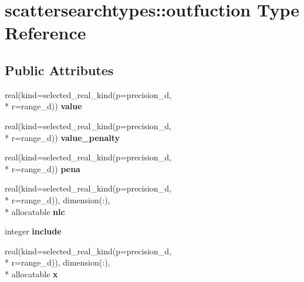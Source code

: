 \hypertarget{structscattersearchtypes_1_1outfuction}{\section{scattersearchtypes\-:\-:outfuction Type Reference}
\label{structscattersearchtypes_1_1outfuction}
}
\subsection*{Public Attributes}
\begin{DoxyCompactItemize}
\item 
\hypertarget{structscattersearchtypes_1_1outfuction_a9f34ff66e0e0e239bd25b33a89cfdb37}{real(kind=selected\-\_\-real\-\_\-kind(p=precision\-\_\-d, \\*
r=range\-\_\-d)) {\bfseries value}}\label{structscattersearchtypes_1_1outfuction_a9f34ff66e0e0e239bd25b33a89cfdb37}

\item 
\hypertarget{structscattersearchtypes_1_1outfuction_a70c628b9eafb48f3517b32fd12fc2306}{real(kind=selected\-\_\-real\-\_\-kind(p=precision\-\_\-d, \\*
r=range\-\_\-d)) {\bfseries value\-\_\-penalty}}\label{structscattersearchtypes_1_1outfuction_a70c628b9eafb48f3517b32fd12fc2306}

\item 
\hypertarget{structscattersearchtypes_1_1outfuction_a21cd2d67b3343cd84a90ca725740d9ca}{real(kind=selected\-\_\-real\-\_\-kind(p=precision\-\_\-d, \\*
r=range\-\_\-d)) {\bfseries pena}}\label{structscattersearchtypes_1_1outfuction_a21cd2d67b3343cd84a90ca725740d9ca}

\item 
\hypertarget{structscattersearchtypes_1_1outfuction_ae0627be8d35e6806569b997c8785ceaa}{real(kind=selected\-\_\-real\-\_\-kind(p=precision\-\_\-d, \\*
r=range\-\_\-d)), dimension(\-:), \\*
allocatable {\bfseries nlc}}\label{structscattersearchtypes_1_1outfuction_ae0627be8d35e6806569b997c8785ceaa}

\item 
\hypertarget{structscattersearchtypes_1_1outfuction_a1d398fe6f57a7b156de8a8d843bf5014}{integer {\bfseries include}}\label{structscattersearchtypes_1_1outfuction_a1d398fe6f57a7b156de8a8d843bf5014}

\item 
\hypertarget{structscattersearchtypes_1_1outfuction_af12102813acc615dd83800b5173ee470}{real(kind=selected\-\_\-real\-\_\-kind(p=precision\-\_\-d, \\*
r=range\-\_\-d)), dimension(\-:), \\*
allocatable {\bfseries x}}\label{structscattersearchtypes_1_1outfuction_af12102813acc615dd83800b5173ee470}

\end{DoxyCompactItemize}


